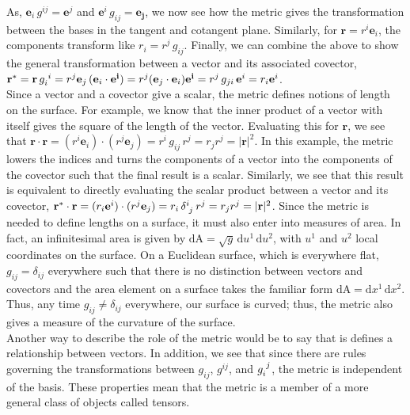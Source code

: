 \begin{appendices}
As, $\mathbf{e}_i \, g^{ij} = \mathbf{e}^j$ and $\mathbf{e}^i \, g_{ij} = \mathbf{e_j}$, we now see how the metric gives the transformation between the bases in the tangent and cotangent plane.
Similarly, for $\mathbf{r} = r^i\mathbf{e}_i$, the components transform like $r_i = r^j \, g_{ij}$.
Finally, we can combine the above to show the general transformation between a vector and its associated covector, $\mathbf{r}^* =\mathbf{r}\,\tensor{g}{_i^i} = r^j\mathbf{e}_j \, (\mathbf{e}_i \cdot \mathbf{e^i}) = r^j (\mathbf{e}_j \cdot \mathbf{e}_i) \mathbf{e^i} = r^j \, g_{ji} \, \mathbf{e}^i = r_i\mathbf{e}^i$. \\

Since a vector and a covector give a scalar, the metric defines notions of length on the surface.
For example, we know that the inner product of a vector with itself gives the square of the length of the vector.
Evaluating this for $\mathbf{r}$, we see that $\mathbf{r} \cdot \mathbf{r} = (r^i \mathbf{e}_i) \cdot (r^j \mathbf{e}_j) = r^i \, g_{ij} \, r^j = r_j r^j = |\mathbf{r}|^2$.
In this example, the metric lowers the indices and turns the components of a vector into the components of the covector such that the final result is a scalar.
Similarly, we see that this result is equivalent to directly evaluating the scalar product between a vector and its covector, $\mathbf{r}^* \cdot \mathbf{r} = (r_i \mathbf{e}^i) \cdot (r^j \mathbf{e}_j) = r_i \, \tensor{\delta}{^i_j} \, r^j = r_j r^j = |\mathbf{r}|^2$.
Since the metric is needed to define lengths on a surface, it must also enter into measures of area.
In fact, an infinitesimal area is given by $\textrm{dA} = \sqrt{g}\,\textrm{d}u^1 \, \textrm{d}u^2$, with $u^1$ and $u^2$ local coordinates on the surface.
On a Euclidean surface, which is everywhere flat, $g_{ij} = \delta_{ij}$ everywhere such that there is no distinction between vectors and covectors and the area element on a surface takes the familiar form $\textrm{dA} = \textrm{d}x^1 \, \textrm{d}x^2$.
Thus, any time $g_{ij} \neq \delta_{ij}$ everywhere, our surface is curved; thus, the metric also gives a measure of the curvature of the surface. \\

Another way to describe the role of the metric would be to say that is defines a relationship between vectors.
In addition, we see that since there are rules governing the transformations between $g_{ij}$, $g^{ij}$, and $\tensor{g}{_i^j}$, the metric is independent of the basis.
These properties mean that the metric is a member of a more general class of objects called tensors.





\end{appendices}
